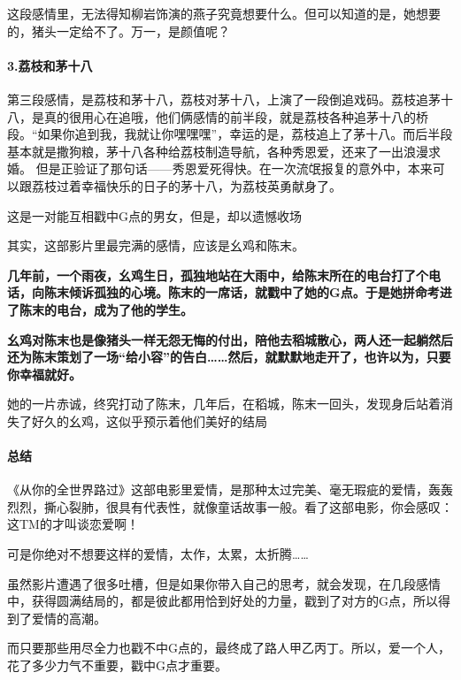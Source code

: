 \documentclass[UTF8,a4paper,8pt]{ctexbook}
\begin{document}
				这段感情里，无法得知柳岩饰演的燕子究竟想要什么。但可以知道的是，她想要的，猪头一定给不了。万一，是颜值呢？
			
			\paragraph{3.荔枝和茅十八}
				第三段感情，是荔枝和茅十八，荔枝对茅十八，上演了一段倒追戏码。荔枝追茅十八，是真的很用心在追哦，他们俩感情的前半段，就是荔枝各种追茅十八的桥段。“如果你追到我，我就让你嘿嘿嘿”，幸运的是，荔枝追上了茅十八。而后半段基本就是撒狗粮，茅十八各种给荔枝制造导航，各种秀恩爱，还来了一出浪漫求婚。	
				但是正验证了那句话——秀恩爱死得快。在一次流氓报复的意外中，本来可以跟荔枝过着幸福快乐的日子的茅十八，为荔枝英勇献身了。
				
				这是一对能互相戳中G点的男女，但是，却以遗憾收场
				
				其实，这部影片里最完满的感情，应该是幺鸡和陈末。
				
				\textbf{几年前，一个雨夜，幺鸡生日，孤独地站在大雨中，给陈末所在的电台打了个电话，向陈末倾诉孤独的心境。陈末的一席话，就戳中了她的G点。于是她拼命考进了陈末的电台，成为了他的学生。}
				
				\textbf{幺鸡对陈末也是像猪头一样无怨无悔的付出，陪他去稻城散心，两人还一起躺然后还为陈末策划了一场“给小容”的告白……然后，就默默地走开了，也许以为，只要你幸福就好。}
				
				她的一片赤诚，终究打动了陈末，几年后，在稻城，陈末一回头，发现身后站着消失了好久的幺鸡，这似乎预示着他们美好的结局
				
			\paragraph{总结}
				《从你的全世界路过》这部电影里爱情，是那种太过完美、毫无瑕疵的爱情，轰轰烈烈，撕心裂肺，很具有代表性，就像童话故事一般。看了这部电影，你会感叹：这TM的才叫谈恋爱啊！
				
				可是你绝对不想要这样的爱情，太作，太累，太折腾……
				
				虽然影片遭遇了很多吐槽，但是如果你带入自己的思考，就会发现，在几段感情中，获得圆满结局的，都是彼此都用恰到好处的力量，戳到了对方的G点，所以得到了爱情的高潮。
				
				而只要那些用尽全力也戳不中G点的，最终成了路人甲乙丙丁。所以，爱一个人，花了多少力气不重要，戳中G点才重要。
\end{document}
